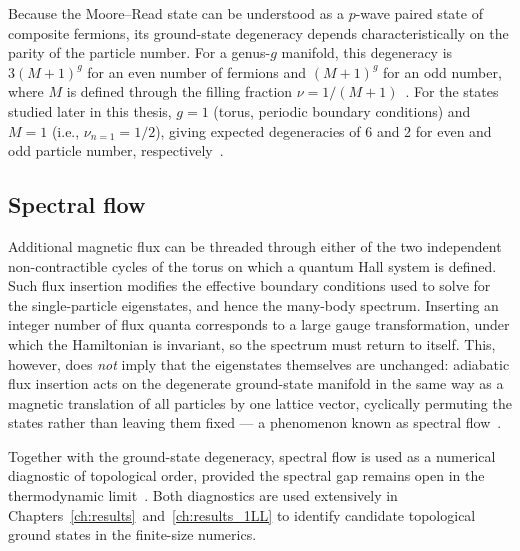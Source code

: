 Because the Moore--Read state can be understood as a $p$-wave paired state of composite fermions, its ground-state degeneracy depends characteristically on the parity of the particle number. For a genus-$g$ manifold, this degeneracy is $3{(M+1)}^g$ for an even number of fermions and $(M+1)^g$ for an odd number, where $M$ is defined through the filling fraction $\nu = 1/(M+1)$~\cite{bernevig2012emergent}. For the states studied later in this thesis, $g=1$ (torus, periodic boundary conditions) and $M=1$ (i.e., $\nu_{n=1} = 1/2$), giving expected degeneracies of 6 and 2 for even and odd particle number, respectively~\cite{read2000paired, oshikawa2006fractionalization}. %

\subsection{Spectral flow}
Additional magnetic flux can be threaded through either of the two independent non-contractible cycles of the torus on which a quantum Hall system is defined. Such flux insertion modifies the effective boundary conditions used to solve for the single-particle eigenstates, and hence the many-body spectrum. Inserting an integer number of flux quanta corresponds to a large gauge transformation, under which the Hamiltonian is invariant, so the spectrum must return to itself. This, however, does \emph{not} imply that the eigenstates themselves are unchanged: adiabatic flux insertion acts on the degenerate ground-state manifold in the same way as a magnetic translation of all particles by one lattice vector, cyclically permuting the states rather than leaving them fixed --- a phenomenon known as spectral flow~\cite{regnault2011fractional}.

Together with the ground-state degeneracy, spectral flow is used as a numerical diagnostic of topological order, provided the spectral gap remains open in the thermodynamic limit~\cite{regnault2011fractional}. Both diagnostics are used extensively in Chapters~\ref{ch:results}~and~\ref{ch:results_1LL} to identify candidate topological ground states in the finite-size numerics.

